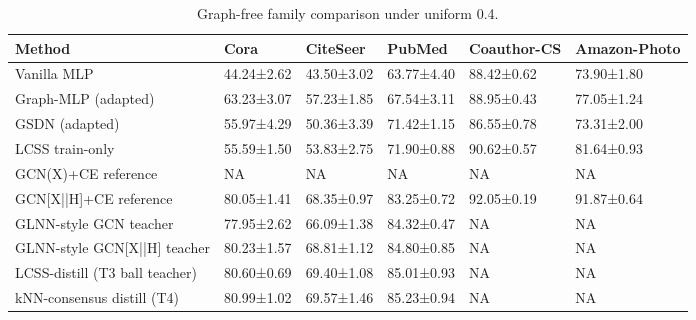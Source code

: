 \begin{table}[t]
\centering
\caption{Graph-free family comparison under uniform 0.4.}
\label{tab:graphfree-family}
\begin{tabular}{llllll}
\toprule
Method & Cora & CiteSeer & PubMed & Coauthor-CS & Amazon-Photo \\
\midrule
Vanilla MLP & 44.24±2.62 & 43.50±3.02 & 63.77±4.40 & 88.42±0.62 & 73.90±1.80 \\
Graph-MLP (adapted) & 63.23±3.07 & 57.23±1.85 & 67.54±3.11 & 88.95±0.43 & 77.05±1.24 \\
GSDN (adapted) & 55.97±4.29 & 50.36±3.39 & 71.42±1.15 & 86.55±0.78 & 73.31±2.00 \\
LCSS train-only & 55.59±1.50 & 53.83±2.75 & 71.90±0.88 & 90.62±0.57 & 81.64±0.93 \\
GCN(X)+CE reference & NA & NA & NA & NA & NA \\
GCN[X||H]+CE reference & 80.05±1.41 & 68.35±0.97 & 83.25±0.72 & 92.05±0.19 & 91.87±0.64 \\
GLNN-style GCN teacher & 77.95±2.62 & 66.09±1.38 & 84.32±0.47 & NA & NA \\
GLNN-style GCN[X||H] teacher & 80.23±1.57 & 68.81±1.12 & 84.80±0.85 & NA & NA \\
LCSS-distill (T3 ball teacher) & 80.60±0.69 & 69.40±1.08 & 85.01±0.93 & NA & NA \\
kNN-consensus distill (T4) & 80.99±1.02 & 69.57±1.46 & 85.23±0.94 & NA & NA \\
\bottomrule
\end{tabular}
\end{table}
